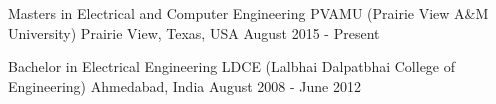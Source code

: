 \begin{cventries}
	\cvedu
	{Masters in Electrical and Computer Engineering} %
	{PVAMU (Prairie View A\&M University)} %
	{Prairie View, Texas, USA} %
	{August 2015 - Present} %
\end{cventries}
\begin{cventries}
	\cvedu
	{Bachelor in Electrical Engineering} %
	{LDCE (Lalbhai Dalpatbhai College of Engineering)} %
	{Ahmedabad, India} %
	{August 2008 - June 2012} %
\end{cventries}


